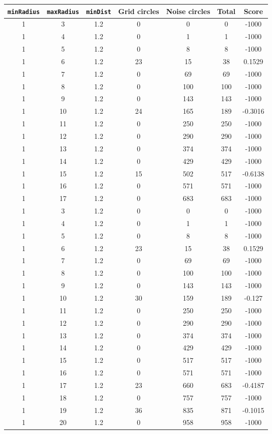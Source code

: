 \documentclass[letterpaper, 12pt]{article}
\begin{document}
\begin{longtable}{|c|c|c|c|c|c|c|}
\hline
\textbf{\texttt{minRadius}} & \textbf{\texttt{maxRadius}} & \textbf{\texttt{minDist}} & \textbf{Grid circles} & \textbf{Noise circles} & \textbf{Total} & \textbf{Score} \\
\hline
1 & 3 & 1.2 & 0 & 0 & 0 & -1000 \\
\hline
1 & 4 & 1.2 & 0 & 1 & 1 & -1000 \\
\hline
1 & 5 & 1.2 & 0 & 8 & 8 & -1000 \\
\hline
1 & 6 & 1.2 & 23 & 15 & 38 & 0.1529 \\
\hline
1 & 7 & 1.2 & 0 & 69 & 69 & -1000 \\
\hline
1 & 8 & 1.2 & 0 & 100 & 100 & -1000 \\
\hline
1 & 9 & 1.2 & 0 & 143 & 143 & -1000 \\
\hline
1 & 10 & 1.2 & 24 & 165 & 189 & -0.3016 \\
\hline
1 & 11 & 1.2 & 0 & 250 & 250 & -1000 \\
\hline
1 & 12 & 1.2 & 0 & 290 & 290 & -1000 \\
\hline
1 & 13 & 1.2 & 0 & 374 & 374 & -1000 \\
\hline
1 & 14 & 1.2 & 0 & 429 & 429 & -1000 \\
\hline
1 & 15 & 1.2 & 15 & 502 & 517 & -0.6138 \\
\hline
1 & 16 & 1.2 & 0 & 571 & 571 & -1000 \\
\hline
1 & 17 & 1.2 & 0 & 683 & 683 & -1000 \\
\hline
1 & 3 & 1.2 & 0 & 0 & 0 & -1000 \\
\hline
1 & 4 & 1.2 & 0 & 1 & 1 & -1000 \\
\hline
1 & 5 & 1.2 & 0 & 8 & 8 & -1000 \\
\hline
1 & 6 & 1.2 & 23 & 15 & 38 & 0.1529 \\
\hline
1 & 7 & 1.2 & 0 & 69 & 69 & -1000 \\
\hline
1 & 8 & 1.2 & 0 & 100 & 100 & -1000 \\
\hline
1 & 9 & 1.2 & 0 & 143 & 143 & -1000 \\
\hline
1 & 10 & 1.2 & 30 & 159 & 189 & -0.127 \\
\hline
1 & 11 & 1.2 & 0 & 250 & 250 & -1000 \\
\hline
1 & 12 & 1.2 & 0 & 290 & 290 & -1000 \\
\hline
1 & 13 & 1.2 & 0 & 374 & 374 & -1000 \\
\hline
1 & 14 & 1.2 & 0 & 429 & 429 & -1000 \\
\hline
1 & 15 & 1.2 & 0 & 517 & 517 & -1000 \\
\hline
1 & 16 & 1.2 & 0 & 571 & 571 & -1000 \\
\hline
1 & 17 & 1.2 & 23 & 660 & 683 & -0.4187 \\
\hline
1 & 18 & 1.2 & 0 & 757 & 757 & -1000 \\
\hline
1 & 19 & 1.2 & 36 & 835 & 871 & -0.1015 \\
\hline
1 & 20 & 1.2 & 0 & 958 & 958 & -1000 \\
\hline
\end{longtable}
\end{document}
